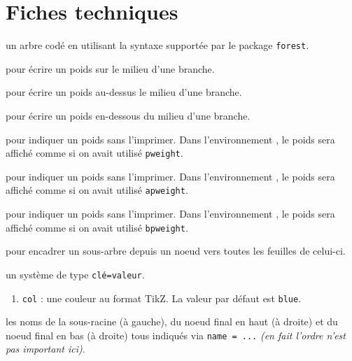 \documentclass[12pt,a4paper]{article}
\begin{document}

\section{Fiches techniques}




\Content{} un arbre codé en utilisant la syntaxe supportée par le package \verb#forest#.

\extraspace

  pour écrire un poids sur le milieu d'une branche.

 pour écrire un poids au-dessus le milieu d'une branche.

 pour écrire un poids en-dessous du milieu d'une branche.

\extraspace

 pour indiquer un poids sans l'imprimer.
Dans l'environnement , le poids sera affiché comme si on avait utilisé \verb#pweight#.

 pour indiquer un poids sans l'imprimer.
Dans l'environnement , le poids sera affiché comme si on avait utilisé \verb#apweight#.

 pour indiquer un poids sans l'imprimer.
Dans l'environnement , le poids sera affiché comme si on avait utilisé \verb#bpweight#.

\extraspace

 pour encadrer un sous-arbre depuis un noeud vers toutes les feuilles de celui-ci.


\separation


 \hfill {}

\IDoption{} un système de type \texttt{clé=valeur}.

\begin{enumerate}
	\item \verb#col# : une couleur au format TikZ. La valeur par défaut est \verb#blue#.
\end{enumerate}


 les noms de la sous-racine (à gauche), du noeud final en haut (à droite) et du noeud final en bas (à droite) tous indiqués via \verb#name = ...# \emph{(en fait l'ordre n'est pas important ici)}.
\end{document}
